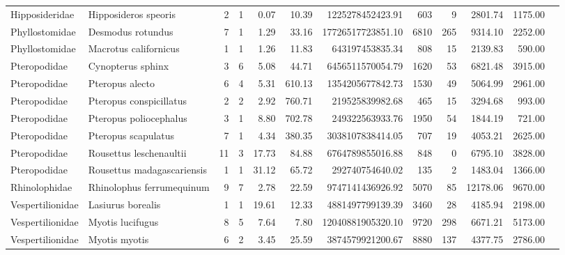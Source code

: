 \begin{landscape}
\begin{longtable}{@{}llrrrrrrrrrr@{}}
  Hipposideridae & Hipposideros speoris &   2 &   1 & 0.07 & 10.39 & 1225278452423.91 & 603 &   9 & 2801.74 & 1175.00 & \cite{chinnasamy2013genetic} \\ 
  Phyllostomidae & Desmodus rotundus &   7 &   1 & 1.29 & 33.16 & 17726517723851.10 & 6810 & 265 & 9314.10 & 2252.00 & \cite{burns2014correlates} \\ 
  Phyllostomidae & Macrotus californicus &   1 &   1 & 1.26 & 11.83 & 643197453835.34 & 808 &  15 & 2139.83 & 590.00 & \cite{burns2014correlates} \\ 
  Pteropodidae & Cynopterus sphinx &   3 &   6 & 5.08 & 44.71 & 6456511570054.79 & 1620 &  53 & 6821.48 & 3915.00 & \cite{burns2014correlates} \\ 
  Pteropodidae & Pteropus alecto &   6 &   4 & 5.31 & 610.13 & 1354205677842.73 & 1530 &  49 & 5064.99 & 2961.00 & \cite{webb1996mobility} \\ 
  Pteropodidae & Pteropus conspicillatus &   2 &   2 & 2.92 & 760.71 & 219525839982.68 & 465 &  15 & 3294.68 & 993.00 & \cite{fox2006population} \\ 
  Pteropodidae & Pteropus poliocephalus &   3 &   1 & 8.80 & 702.78 & 249322563933.76 & 1950 &  54 & 1844.19 & 721.00 & \cite{webb1996mobility} \\ 
  Pteropodidae & Pteropus scapulatus &   7 &   1 & 4.34 & 380.35 & 3038107838414.05 & 707 &  19 & 4053.21 & 2625.00 & \cite{burns2014correlates} \\ 
  Pteropodidae & Rousettus leschenaultii &  11 &   3 & 17.73 & 84.88 & 6764789855016.88 & 848 &   0 & 6795.10 & 3828.00 & \cite{burns2014correlates} \\ 
  Pteropodidae & Rousettus madagascariensis &   1 &   1 & 31.12 & 65.72 & 292740754640.02 & 135 &   2 & 1483.04 & 1366.00 & \cite{burns2014correlates} \\ 
  Rhinolophidae & Rhinolophus ferrumequinum &   9 &   7 & 2.78 & 22.59 & 9747141436926.92 & 5070 &  85 & 12178.06 & 9670.00 & \cite{burns2014correlates} \\ 
  Vespertilionidae & Lasiurus borealis &   1 &   1 & 19.61 & 12.33 & 4881497799139.39 & 3460 &  28 & 4185.94 & 2198.00 & \cite{vonhofgenetic} \\ 
  Vespertilionidae & Myotis lucifugus &   8 &   5 & 7.64 & 7.80 & 12040881905320.10 & 9720 & 298 & 6671.21 & 5173.00 & \cite{vonhof2015range} \\ 
  Vespertilionidae & Myotis myotis &   6 &   2 & 3.45 & 25.59 & 3874579921200.67 & 8880 & 137 & 4377.75 & 2786.00 & \cite{burns2014correlates} \\ 

\end{longtable}
\end{landscape}
